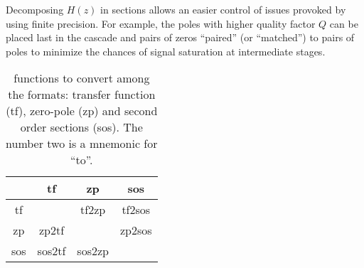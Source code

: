 Decomposing $H(z)$ in sections allows an easier control of issues provoked by using finite precision. For example, the poles with higher quality factor $Q$ can be placed last in the cascade and pairs of zeros ``paired'' (or ``matched'') to pairs of poles to minimize the chances of signal saturation at intermediate stages.

\begin{table}
\centering
\caption[{\matlab} functions to convert among the formats: transfer function (tf), zero-pole (zp) and second order sections (sos)]{{\matlab} functions to convert among the formats: transfer function (tf), zero-pole (zp) and second order sections (sos). The number two is a mnemonic for ``to''.\label{tab:tfzpsos}}
\begin{tabular}{cccc}
\toprule
 & tf & zp & sos
\\\midrule
tf & & tf2zp & tf2sos
\\
zp  & zp2tf & & zp2sos
\\
sos  & sos2tf & sos2zp &
\\\bottomrule
\end{tabular}
\end{table}


